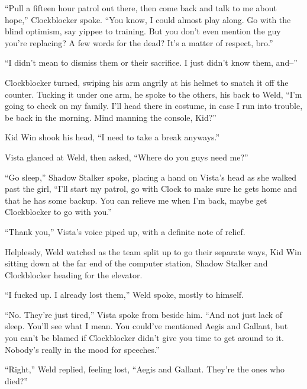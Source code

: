 ``Pull a fifteen hour patrol out there, then come back and talk to me about hope,'' Clockblocker spoke.  ``You know, I could almost play along.  Go with the blind optimism, say yippee to training.  But you don't even mention the guy you're replacing?  A few words for the dead?  It's a matter of respect, bro.''



``I didn't mean to dismiss them or their sacrifice.  I just didn't know them, and--''



Clockblocker turned, swiping his arm angrily at his helmet to snatch it off the counter.  Tucking it under one arm, he spoke to the others, his back to Weld, ``I'm going to check on my family.  I'll head there in costume, in case I run into trouble, be back in the morning.  Mind manning the console, Kid?''



Kid Win shook his head, ``I need to take a break anyways.''



Vista glanced at Weld, then asked, ``Where do you guys need me?''



``Go sleep,'' Shadow Stalker spoke, placing a hand on Vista's head as she walked past the girl, ``I'll start my patrol, go with Clock to make sure he gets home and that he has some backup.  You can relieve me when I'm back, maybe get Clockblocker to go with you.''



``Thank you,'' Vista's voice piped up, with a definite note of relief.



Helplessly, Weld watched as the team split up to go their separate ways, Kid Win sitting down at the far end of the computer station, Shadow Stalker and Clockblocker heading for the elevator.



``I fucked up.  I already lost them,'' Weld spoke, mostly to himself.



``No.  They're just tired,'' Vista spoke from beside him.  ``And not just lack of sleep.  You'll see what I mean.  You could've mentioned Aegis and Gallant, but you can't be blamed if Clockblocker didn't give you time to get around to it.  Nobody's really in the mood for speeches.''



``Right,'' Weld replied, feeling lost, ``Aegis and Gallant.  They're the ones who died?''




